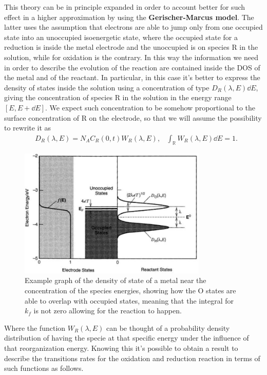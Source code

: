 This theory can be in principle expanded in order to account better for such effect in a higher approximation by using the \textbf{Gerischer-Marcus model}. The latter uses the assumption that electrons are able to jump only from one occupied state into an unoccupied isoenergetic state, where the occupied state for a reduction is inside the metal electrode and the unoccupied is on species R in the solution, while for oxidation is the contrary. In this way the information we need in order to describe the evolution of the reaction are contained inside the DOS of the metal and of the reactant. In particular, in this case it's better to express the density of states inside the solution using a concentration of type $D_R(\lambda, E)\dd E$, giving the concentration of species R in the solution in the energy range $[E , E + \dd E]$. We expect such concentration to be somehow proportional to the surface concentration of R on the electrode, so that we will assume the possibility to rewrite it as
\begin{align}
    &D_R(\lambda, E) = N_A C_R(0, t) W_R(\lambda, E), & \int_\mathbb{R}W_R(\lambda, E)\dd E = 1.
\end{align}
\begin{figure}[t]
    \centering
    \includegraphics[width=0.8\textwidth]{Immagini/GMtheory.png}
    \caption{
        Example graph of the density of state of a metal near the concentration of the species energies, showing how the O states are able to overlap with occupied states, meaning that the integral for $k_f$ is not zero allowing for the reaction to happen.
    }
    \label{fig:GMtheory}
\end{figure}
Where the function $W_R(\lambda, E)$ can be thought of a probability density distribution of having the specie at that specific energy under the influence of that reorganization energy. Knowing this it's possible to obtain a result to describe the transitions rates for the oxidation and reduction reaction in terms of such functions as follows.
